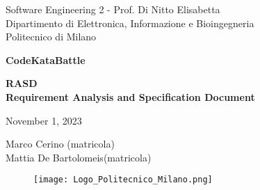 \documentclass{article}
\begin{document}
\begin{titlepage}
  \centering
  {\normalsize
    Software Engineering 2 - Prof. Di Nitto Elisabetta \\
    Dipartimento di Elettronica, Informazione e Bioingegneria \\
    Politecnico di Milano \par
  }     \vspace{3cm}
  {\Huge \textbf{CodeKataBattle\\} } \vspace{1cm}
  {\large \textbf{RASD\\Requirement Analysis and Specification Document} \par} \vspace{1cm}
  {\normalsize November 1, 2023 \par} \vspace{4cm}
  {\normalsize Marco Cerino (matricola) \\ Mattia De Bartolomeis(matricola) \par} \vspace{4cm}
  \begin{figure}[h]
    \centering
    \texttt{[image: Logo\_Politecnico\_Milano.png]}
  \end{figure} \vspace{0.5cm}
\end{titlepage}

\tableofcontents


\end{document}
